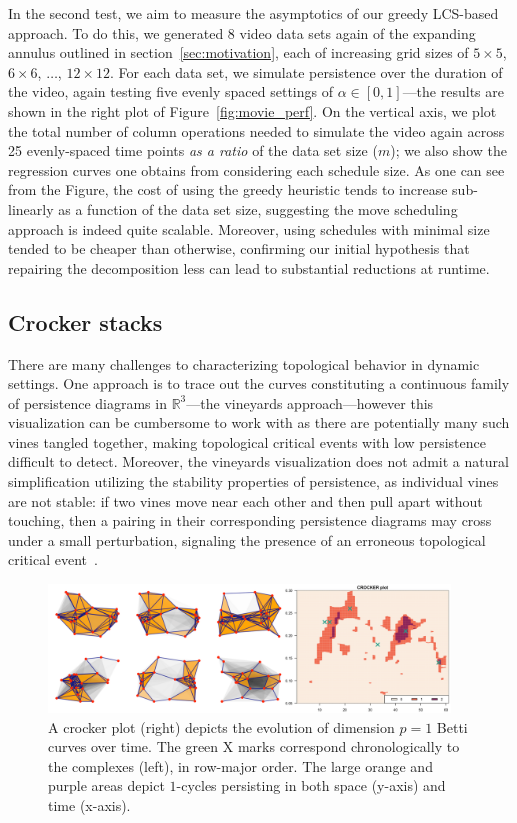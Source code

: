 \documentclass[sn-mathphys]{sn-jnl}
\begin{document}
In the second test, we aim to measure the asymptotics of our greedy LCS-based approach. To do this, we generated 8 video data sets again of the expanding annulus outlined in section~\ref{sec:motivation}, each of increasing grid sizes of $5 \times 5$, $6 \times 6$, $\dots$, $12 \times 12$. For each data set, we simulate persistence over the duration of the video, again testing five evenly spaced settings of $\alpha \in [0,1]$---the results are shown in the right plot of Figure~\ref{fig:movie_perf}. On the vertical axis, we plot the total number of column operations needed to simulate the video again across 25 evenly-spaced time points \emph{as a ratio} of the data set size ($m$); we also show the regression curves one obtains from considering each schedule size. As one can see from the Figure, the cost of using the greedy heuristic tends to increase sub-linearly as a function of the data set size, suggesting the move scheduling approach is indeed quite scalable. Moreover, using schedules with minimal size tended to be cheaper than otherwise, confirming our initial hypothesis that repairing the decomposition less can lead to substantial reductions at runtime.  

\subsection{Crocker stacks}
There are many challenges to characterizing topological behavior in dynamic settings. One approach is to trace out the curves constituting a continuous family of persistence diagrams in $\mathbb{R}^3$---the vineyards approach---however this visualization can be cumbersome to work with as there are potentially many such vines tangled together, making topological critical events with low persistence difficult to detect. Moreover, the vineyards visualization does not admit a natural simplification utilizing the stability properties of persistence, as individual vines are not stable: if two vines move near each other and then pull apart without touching, then a pairing in their corresponding persistence diagrams may cross under a small perturbation, signaling the presence of an erroneous topological critical event~\cite{topaz2015topological, xian2020capturing}. 

\begin{figure}[t]
	\centering
	\includegraphics[width=0.95\textwidth]{crocker_combo_1.png}
	\caption{A crocker plot (right) depicts the evolution of dimension $p = 1$ Betti curves over time. The green $\mathrm{X}$ marks correspond chronologically to the complexes (left), in row-major order. The large orange and purple areas depict $1$-cycles persisting in both space (y-axis) and time (x-axis).} \label{fig:crocker1}
\end{figure}
\end{document}
